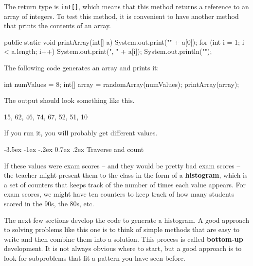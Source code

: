 \documentclass[12pt]{book}
\makeatletter
\theoremstyle{exercise}
\newcommand{\java}[1]{\verb"#1"}
\renewcommand{\section}{\@startsection{section}{1}{\z@}%
    {-3.5ex \@plus -1ex \@minus -.2ex}%
    {0.7ex \@plus.2ex}%
    {\normalfont\Large\bfseries}}
\newcommand{\java}[1]{\lstinline{#1}} %
\makeatother
\begin{document}
The return type is \java{int[]}, which means that this method returns a reference to an array of integers.
To test this method, it is convenient to have another method that prints the contents of an array.

\begin{code}
    public static void printArray(int[] a) {
        System.out.print("{" + a[0]);
        for (int i = 1; i < a.length; i++) {
            System.out.print(", " + a[i]);
        }
        System.out.println("}");
    }
\end{code}

The following code generates an array and prints it:

\begin{code}
    int numValues = 8;
    int[] array = randomArray(numValues);
    printArray(array);
\end{code}

The output should look something like this.

\begin{stdout}
{15, 62, 46, 74, 67, 52, 51, 10}
\end{stdout}

If you run it, you will probably get different values.


\section{Traverse and count}


If these values were exam scores -- and they would be pretty bad exam scores -- the teacher might present them to the class in the form of a {\bf histogram}, which is a set of counters that keeps track of the number of times each value appears.
For exam scores, we might have ten counters to keep track of how many students scored in the 90s, the 80s, etc.


The next few sections develop the code to generate a histogram.
A good approach to solving problems like this one is to think of simple methods that are easy to write and then combine them into a solution.
This process is called {\bf bottom-up} development.
It is not always obvious where to start, but a good approach is to look for subproblems that fit a pattern you have seen before.

\end{document}
